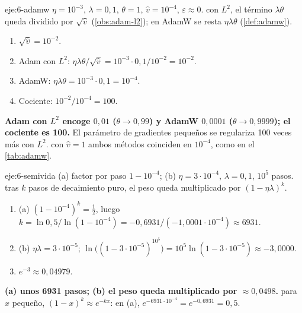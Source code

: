 \begin{solucion}{eje:6-adamw}
\datos $\eta=10^{-3}$, $\lambda=0{,}1$, $\theta=1$, $\hat v=10^{-4}$, $\varepsilon\approx 0$.
\planteamiento con $L^{2}$, el término $\lambda\theta$ queda dividido por $\sqrt{\hat v}$ (\cref{obs:adam-l2}); en AdamW se resta $\eta\lambda\theta$ (\cref{def:adamw}).
\pasos
\begin{enumerate}[label=\arabic*.]
  \item $\sqrt{\hat v}=10^{-2}$.
  \item Adam con $L^{2}$: $\eta\lambda\theta/\sqrt{\hat v}=10^{-3}\cdot 0{,}1/10^{-2}=10^{-2}$.
  \item AdamW: $\eta\lambda\theta=10^{-3}\cdot 0{,}1=10^{-4}$.
  \item Cociente: $10^{-2}/10^{-4}=100$.
\end{enumerate}
\resultado \textbf{Adam con $L^{2}$ encoge $0{,}01$ ($\theta\to 0{,}99$) y AdamW $0{,}0001$ ($\theta\to 0{,}9999$); el cociente es 100.} El parámetro de gradientes pequeños se regulariza 100 veces más con $L^{2}$.
\comprobacion con $\hat v=1$ ambos métodos coinciden en $10^{-4}$, como en el \cref{tab:adamw}.
\end{solucion}

\begin{solucion}{eje:6-semivida}
\datos (a) factor por paso $1-10^{-4}$; (b) $\eta=3\cdot 10^{-4}$, $\lambda=0{,}1$, $10^{5}$ pasos.
\planteamiento tras $k$ pasos de decaimiento puro, el peso queda multiplicado por $(1-\eta\lambda)^{k}$.
\pasos
\begin{enumerate}[label=\arabic*.]
  \item (a) $(1-10^{-4})^{k}=\frac12$, luego $k=\ln 0{,}5/\ln(1-10^{-4})=-0{,}6931/(-1{,}0001\cdot 10^{-4})\approx 6931$.
  \item (b) $\eta\lambda=3\cdot 10^{-5}$; $\ln\bigl((1-3\cdot 10^{-5})^{10^{5}}\bigr)=10^{5}\ln(1-3\cdot 10^{-5})\approx-3{,}0000$.
  \item $e^{-3}\approx 0{,}04979$.
\end{enumerate}
\resultado \textbf{(a) unos 6931 pasos; (b) el peso queda multiplicado por $\approx 0{,}0498$.}
\comprobacion para $x$ pequeño, $(1-x)^{k}\approx e^{-kx}$: en (a), $e^{-6931\cdot 10^{-4}}=e^{-0{,}6931}=0{,}5$.
\end{solucion}

